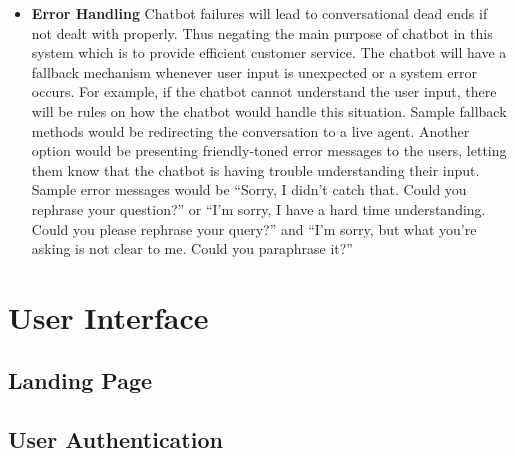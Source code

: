 \begin{itemize}
	\item \textbf{Error Handling}
	Chatbot failures will lead to conversational dead ends if not dealt with properly. Thus negating the main purpose of chatbot in this system which is to provide efficient customer service. The chatbot will have a fallback mechanism whenever user input is unexpected or a system error occurs. For example, if the chatbot cannot understand the user input, there will be rules on how the chatbot would handle this situation. Sample fallback methods would be redirecting the conversation to a live agent. Another option would be presenting friendly-toned error messages to the users, letting them know that the chatbot is having trouble understanding their input. Sample error messages would be “Sorry, I didn't catch that. Could you rephrase your question?” or “I'm sorry, I have a hard time understanding. Could you please rephrase your query?” and “I'm sorry, but what you're asking is not clear to me. Could you paraphrase it?”
	
\end{itemize}


\section{User Interface}

\subsection{Landing Page}

\subsection{User Authentication}